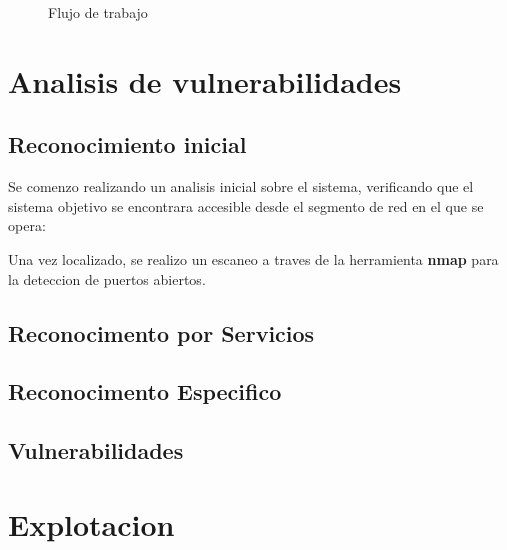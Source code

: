 \documentclass[a4paper]{article}%
\begin{document}
	\vspace{0.5cm}

	\begin{figure}[h]
	\begin{center}
	\end{center}
	\caption{Flujo de trabajo}
	\end{figure}

	\clearpage
	\section{Analisis de vulnerabilidades}
	\subsection{Reconocimiento inicial}

	\vspace{0.2cm}
	Se comenzo realizando un analisis inicial sobre el sistema, verificando que el sistema
	objetivo se encontrara accesible desde el segmento de red en el que se opera:


	\vspace{0.2cm}

	Una vez localizado, se realizo un escaneo a traves de la herramienta \textbf{nmap} 
	para la deteccion de puertos abiertos.
	
	\subsection{Reconocimento por Servicios}




	\subsection{Reconocimento Especifico}


	\subsection{Vulnerabilidades}


	\section{Explotacion}
\end{document}
